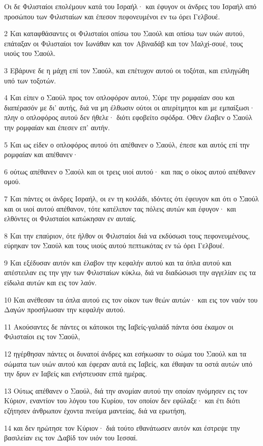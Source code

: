 \par Οι δε Φιλισταίοι επολέμουν κατά του Ισραήλ· και έφυγον οι άνδρες του Ισραήλ από προσώπου των Φιλισταίων και έπεσον πεφονευμένοι εν τω όρει Γελβουέ.
\par 2 Και καταφθάσαντες οι Φιλισταίοι οπίσω του Σαούλ και οπίσω των υιών αυτού, επάταξαν οι Φιλισταίοι τον Ιωνάθαν και τον Αβιναδάβ και τον Μαλχί-σουέ, τους υιούς του Σαούλ.
\par 3 Εβάρυνε δε η μάχη επί τον Σαούλ, και επέτυχον αυτού οι τοξόται, και επληγώθη υπό των τοξοτών.
\par 4 Και είπεν ο Σαούλ προς τον οπλοφόρον αυτού, Σύρε την ρομφαίαν σου και διαπέρασόν με δι' αυτής, διά να μη έλθωσιν ούτοι οι απερίτμητοι και με εμπαίξωσι· πλην ο οπλοφόρος αυτού δεν ήθελε· διότι εφοβείτο σφόδρα. Όθεν έλαβεν ο Σαούλ την ρομφαίαν και έπεσεν επ' αυτήν.
\par 5 Και ως είδεν ο οπλοφόρος αυτού ότι απέθανεν ο Σαούλ, έπεσε και αυτός επί την ρομφαίαν και απέθανεν·
\par 6 ούτως απέθανεν ο Σαούλ και οι τρεις υιοί αυτού· και πας ο οίκος αυτού απέθανεν ομού.
\par 7 Και πάντες οι άνδρες Ισραήλ, οι εν τη κοιλάδι, ιδόντες ότι έφευγον και ότι ο Σαούλ και οι υιοί αυτού απέθανον, τότε κατέλιπον τας πόλεις αυτών και έφυγον· και ελθόντες οι Φιλισταίοι κατώκησαν εν αυταίς.
\par 8 Και την επαύριον, ότε ήλθον οι Φιλισταίοι διά να εκδύσωσι τους πεφονευμένους, εύρηκαν τον Σαούλ και τους υιούς αυτού πεπτωκότας εν τώ όρει Γελβουέ.
\par 9 Και εξέδυσαν αυτόν και έλαβον την κεφαλήν αυτού και τα όπλα αυτού και απέστειλαν εις την γην των Φιλισταίων κύκλω, διά να διαδώσωσι την αγγελίαν εις τα είδωλα αυτών και εις τον λαόν.
\par 10 Και ανέθεσαν τα όπλα αυτού εις τον οίκον των θεών αυτών· και εις τον ναόν του Δαγών προσήλωσαν την κεφαλήν αυτού.
\par 11 Ακούσαντες δε πάντες οι κάτοικοι της Ιαβείς-γαλαάδ πάντα όσα έκαμον οι Φιλισταίοι εις τον Σαούλ,
\par 12 ηγέρθησαν πάντες οι δυνατοί άνδρες και εσήκωσαν το σώμα του Σαούλ και τα σώματα των υιών αυτού και έφεραν αυτά εις Ιαβείς, και έθαψαν τα οστά αυτών υπό την δρυν εν Ιαβείς και ενήστευσαν επτά ημέρας.
\par 13 Ούτως απέθανεν ο Σαούλ, διά την ανομίαν αυτού την οποίαν ηνόμησεν εις τον Κύριον, εναντίον του λόγου του Κυρίου, τον οποίον δεν εφύλαξε· και έτι διότι εζήτησεν άνθρωπον έχοντα πνεύμα μαντείας, διά να ερωτήση,
\par 14 και δεν ηρώτησε τον Κύριον· διά τούτο εθανάτωσεν αυτόν και έστρεψε την βασιλείαν εις τον Δαβίδ τον υιόν του Ιεσσαί.

